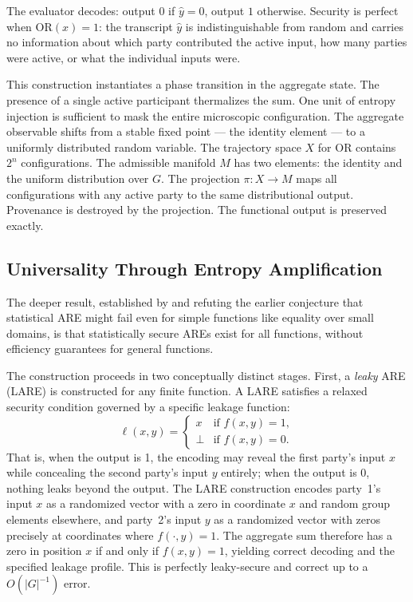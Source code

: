 \documentclass[12pt, a4paper]{article}
\theoremstyle{essaystyle}
\begin{document}
The evaluator decodes: output $0$ if $\hat{y} = 0$, output $1$ otherwise. Security is
perfect when $\mathrm{OR}(x) = 1$: the transcript $\hat{y}$ is indistinguishable from
random and carries no information about which party contributed the active input, how
many parties were active, or what the individual inputs were.

This construction instantiates a phase transition in the aggregate state. The presence
of a single active participant thermalizes the sum. One unit of entropy injection is
sufficient to mask the entire microscopic configuration. The aggregate observable shifts
from a stable fixed point --- the identity element --- to a uniformly distributed random
variable. The trajectory space $X$ for OR contains $2^n$ configurations. The admissible
manifold $M$ has two elements: the identity and the uniform distribution over $G$.
The projection $\pi : X \to M$ maps all configurations with any active party to the
same distributional output. Provenance is destroyed by the projection. The functional
output is preserved exactly.

\subsection{Universality Through Entropy Amplification}

The deeper result, established by \citet{shufflinguniversal} and refuting the earlier
conjecture that statistical ARE might fail even for simple functions like equality over
small domains, is that statistically secure AREs exist for all functions, without
efficiency guarantees for general functions.

The construction proceeds in two conceptually distinct stages. First, a \emph{leaky}
ARE (LARE) is constructed for any finite function. A LARE satisfies a relaxed security
condition governed by a specific leakage function:
\[
\ell(x, y) =
\begin{cases}
x & \text{if } f(x,y) = 1, \\
\perp & \text{if } f(x,y) = 0.
\end{cases}
\]
That is, when the output is 1, the encoding may reveal the first party's input $x$
while concealing the second party's input $y$ entirely; when the output is 0, nothing
leaks beyond the output. The LARE construction encodes party~1's input $x$ as a
randomized vector with a zero in coordinate $x$ and random group elements elsewhere,
and party~2's input $y$ as a randomized vector with zeros precisely at coordinates
where $f(\cdot, y) = 1$. The aggregate sum therefore has a zero in position $x$ if
and only if $f(x,y) = 1$, yielding correct decoding and the specified leakage profile.
This is perfectly leaky-secure and correct up to a $O(|G|^{-1})$ error.
\end{document}
